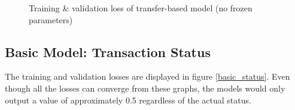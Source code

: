 \documentclass[12pt,twoside]{report}
\begin{document}
\begin{figure}[!htbp]
	\centering
	\hfill
	\hfill
	\hfil
	\hfil
	\caption{Training \& validation loss of transfer-based model (no frozen parameters)}
	\label{transfer_based_status_no_freeze}
\end{figure}

\subsection{Basic Model: Transaction Status}
\label{basic_status_training_included}
The training and validation losses are displayed in figure \ref{basic_status}. Even though all the losses can converge from these graphs, the models would only output a value of approximately 0.5 regardless of the actual status.
\\
\end{document}
